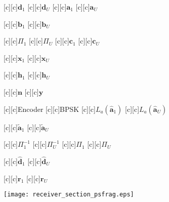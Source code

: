 \documentclass{article}
\begin{document}
\begin{figure}[htb]
  \begin{center}


        [c][c]{$\mathrm{\mathbf{d}}_1$}
        [c][c]{$\mathrm{\mathbf{d}}_U$}
        [c][c]{$\mathrm{\mathbf{a}}_1$}
        [c][c]{$\mathrm{\mathbf{a}}_U$}

        [c][c]{$\mathrm{\mathbf{b}}_1$}
        [c][c]{$\mathrm{\mathbf{b}}_U$}
	
        [c][c]{$\Pi_1$}
        [c][c]{$\Pi_U$}
        [c][c]{$\mathrm{\mathbf{c}}_1$}
        [c][c]{$\mathrm{\mathbf{c}}_U$}

        [c][c]{$\mathrm{\mathbf{x}}_1$}
        [c][c]{$\mathrm{\mathbf{x}}_U$}
	
	[c]{$\mathrm{\mathbf{h}}_1$}
        [c][c]{$\mathrm{\mathbf{h}}_U$}


        [c][c]{$\mathrm{\mathbf{n}}$}
        [c][c]{$\mathrm{\mathbf{y}}$}

        [c][c]{Encoder}
        [c][c]{BPSK}
	[c]{$L_a(\mathrm{\mathbf{\hat{a}}}_1)$}
        [c][c]{$L_a(\mathrm{\mathbf{\hat{a}}}_U)$}

	
	
	
        
        
	[c]{\hspace{3mm}$\mathrm{\mathbf{\tilde{a}}}_1$}
        [c][c]{\hspace{3mm}$\mathrm{\mathbf{\tilde{a}}}_U$}
        
	[c]{\hspace{1mm}$\Pi_1^{-1}$}
        [c][c]{\hspace{1mm}$\Pi_U^{-1}$}
        [c][c]{$\Pi_1$}
        [c][c]{$\Pi_U$}
       
	[c]{$\mathrm{\mathbf{\hat{d}}}_1$}
        [c][c]{$\mathrm{\mathbf{\hat{d}}}_U$}
	

        [c][c]{$\mathrm{\mathbf{r}}_1$}
	[c]{$\mathrm{\mathbf{r}}_U$}
	

	
	
	


    \texttt{[image: receiver\_section\_psfrag.eps]}
    \end{center}
\end{figure}
\end{document}
